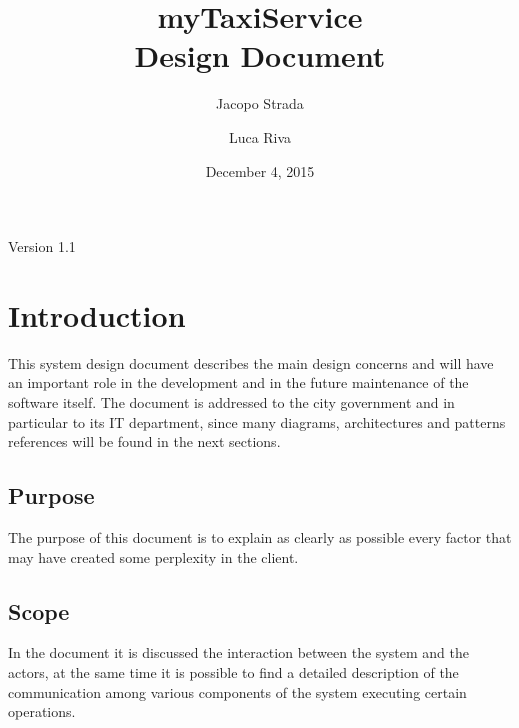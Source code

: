 \documentclass[a4paper]{article}
\title{{\Huge myTaxiService} \\ Design Document}
\author{Jacopo Strada \and Luca Riva}
\date{December 4, 2015}
\begin{document}
\maketitle
\vfill
\begin{flushright}
Version 1.1
\end{flushright}

\newpage

\tableofcontents

\newpage

\vfill

\listoffigures 

\vfill

\listoftables

\vfill

\listofalgorithms

\vfill

\let\stdsection\section
\renewcommand\section{\newpage\stdsection}

\setlength{\parindent}{0em}
\setlength{\parskip}{1em}

\section{Introduction}
This system design document describes the main design concerns and will have an important role in the development and in the future maintenance of the software itself. The document is addressed to the city government and in particular to its IT department, since many diagrams, architectures and patterns references will be found in the next sections.

\subsection{Purpose}
The purpose of this document is to explain as clearly as possible every factor that may have created some perplexity in the client.

\subsection{Scope}
In the document it is discussed the interaction between the system and the actors, at the same time it is possible to find a detailed description of the communication among various components of the system executing certain operations.
\end{document}
